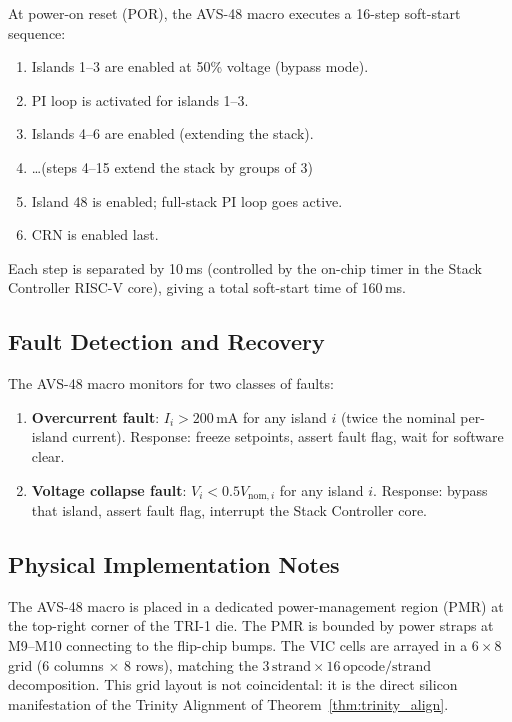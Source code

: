 At power-on reset (POR), the AVS-48 macro executes a 16-step soft-start
sequence:
\begin{enumerate}
  \item Islands 1--3 are enabled at 50\% voltage (bypass mode).
  \item PI loop is activated for islands 1--3.
  \item Islands 4--6 are enabled (extending the stack).
  \item \ldots (steps 4--15 extend the stack by groups of 3)
  \item Island 48 is enabled; full-stack PI loop goes active.
  \item CRN is enabled last.
\end{enumerate}
Each step is separated by 10\,ms (controlled by the on-chip timer
in the Stack Controller RISC-V core), giving a total soft-start time
of 160\,ms.

\subsection{Fault Detection and Recovery}

The AVS-48 macro monitors for two classes of faults:
\begin{enumerate}
  \item \textbf{Overcurrent fault}: $I_i > 200\,\mathrm{mA}$ for any island $i$
        (twice the nominal per-island current).  Response: freeze setpoints,
        assert fault flag, wait for software clear.
  \item \textbf{Voltage collapse fault}: $V_i < 0.5 V_{\mathrm{nom},i}$ for any
        island $i$.  Response: bypass that island, assert fault flag, interrupt
        the Stack Controller core.
\end{enumerate}

\subsection{Physical Implementation Notes}

The AVS-48 macro is placed in a dedicated power-management region
(PMR) at the top-right corner of the TRI-1 die.  The PMR is bounded by
power straps at M9--M10 connecting to the flip-chip bumps.  The VIC
cells are arrayed in a $6 \times 8$ grid (6 columns $\times$ 8 rows),
matching the $3\,\mathrm{strand} \times 16\,\mathrm{opcode/strand}$ decomposition.
This grid layout is not coincidental: it is the direct silicon
manifestation of the Trinity Alignment of Theorem~\ref{thm:trinity_align}.

